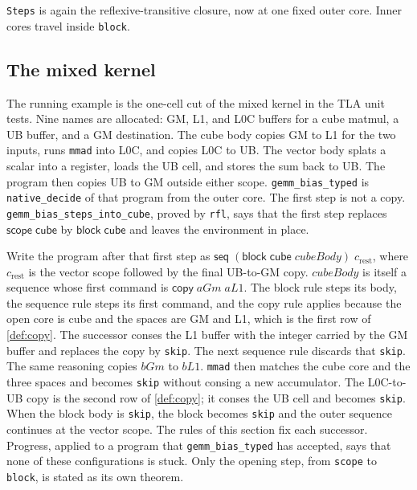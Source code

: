 \documentclass[a4paper,UKenglish,anonymous,cleveref,autoref]{lipics-v2021}
\begin{document}
\texttt{Steps} is again the reflexive-transitive closure, now at one fixed outer core.
Inner cores travel inside \texttt{block}.

\subsection{The mixed kernel}

The running example is the one-cell cut of the mixed kernel in the TLA unit tests.
Nine names are allocated: GM, L1, and L0C buffers for a cube matmul, a UB buffer, and a GM destination.
The cube body copies GM to L1 for the two inputs, runs \texttt{mmad} into L0C, and copies L0C to UB.
The vector body splats a scalar into a register, loads the UB cell, and stores the sum back to UB.
The program then copies UB to GM outside either scope.
\texttt{gemm\_bias\_typed} is \texttt{native\_decide} of that program from the outer core.
The first step is not a copy.
\texttt{gemm\_bias\_steps\_into\_cube}, proved by \texttt{rfl}, says that the first step replaces \(\mathsf{scope}\;\mathsf{cube}\) by \(\mathsf{block}\;\mathsf{cube}\) and leaves the environment in place.

\begin{definition}
\label{def:trace}
Write the program after that first step as \(\mathsf{seq}\;(\mathsf{block}\;\mathsf{cube}\;\mathit{cubeBody})\;c_{\mathrm{rest}}\), where \(c_{\mathrm{rest}}\) is the vector scope followed by the final UB-to-GM copy.
\(\mathit{cubeBody}\) is itself a sequence whose first command is \(\mathsf{copy}\;\mathit{aGm}\;\mathit{aL1}\).
The block rule steps its body, the sequence rule steps its first command, and the copy rule applies because the open core is cube and the spaces are GM and L1, which is the first row of \cref{def:copy}.
The successor conses the L1 buffer with the integer carried by the GM buffer and replaces the copy by \texttt{skip}.
The next sequence rule discards that \texttt{skip}.
The same reasoning copies \(\mathit{bGm}\) to \(\mathit{bL1}\).
\texttt{mmad} then matches the cube core and the three spaces and becomes \texttt{skip} without consing a new accumulator.
The L0C-to-UB copy is the second row of \cref{def:copy}; it conses the UB cell and becomes \texttt{skip}.
When the block body is \texttt{skip}, the block becomes \texttt{skip} and the outer sequence continues at the vector scope.
The rules of this section fix each successor.
Progress, applied to a program that \texttt{gemm\_bias\_typed} has accepted, says that none of these configurations is stuck.
Only the opening step, from \texttt{scope} to \texttt{block}, is stated as its own theorem.
\end{definition}
\end{document}
